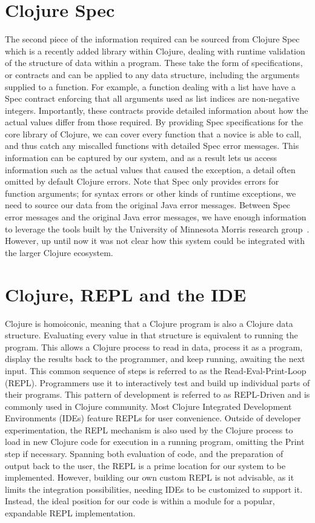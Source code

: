 \documentclass[12pt]{article}
\newcommand{\comment}[1]{{\bf \tt  {#1}}}
\begin{document}
\section{Clojure Spec}
The second piece of the information required can be sourced from Clojure Spec~\cite{spec}
which is a recently added library within Clojure, dealing with runtime validation of
the structure of data within a program. These take the form of specifications, or contracts
and can be applied to any data structure, including the arguments supplied to a function.
 For example, a function dealing with a list have have a Spec contract enforcing that all arguments
 used as list indices are non-negative integers.
Importantly, these contracts provide detailed information
 about how the actual values differ from those required.
By providing Spec specifications for the core library of Clojure,
 we can cover every function that a novice is able to call, and thus catch
 any miscalled functions with detailed Spec error messages.
 This information can be captured by our system, and as a result
 lets us access information such as the actual values that caused the exception,
 a detail often omitted by default Clojure errors.
Note that Spec only provides errors for function arguments; for syntax errors or other kinds of
runtime exceptions, we need to source our data from the original Java error messages.
Between Spec error messages and the original Java error messages, we have enough
information to leverage the tools built by the
 University of Minnesota Morris research group~\cite{mics2017}.
However, up until now it was not clear how this system could be integrated with the larger Clojure ecosystem.

\section{Clojure, REPL and the IDE}
Clojure is homoiconic, meaning that a Clojure program is also a Clojure data structure.
 Evaluating every value in that structure is
equivalent to running the program.
This allows a Clojure process to read in data, process it as a program, display the results
 back to the programmer, and keep running, awaiting the next input.
 This common sequence of steps is referred to
as the Read-Eval-Print-Loop (REPL). Programmers use it to interactively test and build up
individual parts of their programs. This pattern of development is
referred to as REPL-Driven and is commonly used in Clojure community.
 Most Clojure Integrated Development Environments (IDEs) feature REPLs for
 user convenience. Outside of developer experimentation, the REPL mechanism is also used
by the Clojure process to load in new Clojure code for execution in a running program,
omitting the Print step if necessary.
Spanning both evaluation of code, and the preparation of output back to the user,
the REPL is a prime location for our system to be implemented.
However, building our own custom REPL is not advisable, as it limits the
integration possibilities, needing IDEs to be customized to support it.
Instead, the ideal position for our code is within a module
 for a popular, expandable REPL implementation.
\end{document}
